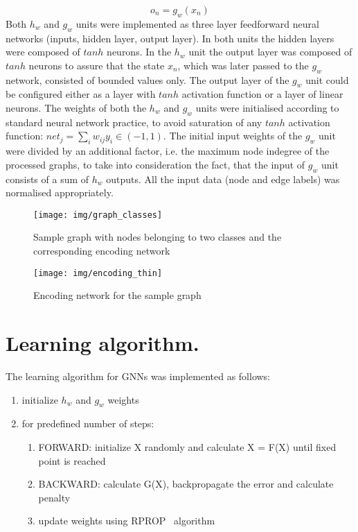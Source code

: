 \documentclass[a4paper, 11pt, twocolumn]{spie}  %
\begin{document}
\begin{equation}
o_n = g_w(x_n)
\label{eq:gw}
\end{equation}
Both $h_w$ and $g_w$ units were implemented as three layer feedforward neural networks (inputs, hidden layer, output layer). In both units the hidden layers were composed of $tanh$ neurons. In the $h_w$ unit the output layer was composed of $tanh$ neurons to assure that the state $x_n$, which was later passed to the $g_w$ network, consisted of bounded values only. The output layer of the $g_w$ unit could be configured either as a layer with $tanh$ activation function or a layer of linear neurons. The weights of both the $h_w$ and $g_w$ units were initialised according to standard neural network practice, to avoid saturation of any $tanh$ activation function: $net_j = \sum_i w_{ij} y_i \in (-1, 1)$. The initial input weights of the $g_w$ unit were divided by an additional factor, i.e. the maximum node indegree of the processed graphs, to take into consideration the fact, that the input of $g_w$ unit consists of a sum of $h_w$ outputs. All the input data (node and edge labels) was normalised appropriately.

\begin{figure}
\begin{center}
	\texttt{[image: img/graph\_classes]}
	\caption{Sample graph with nodes belonging to two classes and the corresponding encoding network}
	\label{fig:graph}
\end{center}
\end{figure}

\begin{figure}
\begin{center}
	\texttt{[image: img/encoding\_thin]}
	\caption{Encoding network for the sample graph}
	\label{fig:enc}
\end{center}
\end{figure}

\section{Learning algorithm.}
The learning algorithm for GNNs was implemented as follows:
\begin{enumerate}
	\item initialize $h_w$ and $g_w$ weights
	\item for predefined number of steps:
	\begin{enumerate}
		\item FORWARD: initialize X randomly and calculate X = F(X) until fixed point is reached
		\item BACKWARD: calculate G(X), backpropagate the error and calculate penalty
		\item update weights using RPROP~\cite{riedmiller1993direct} algorithm
	\end{enumerate}
\end{enumerate}
\end{document}
